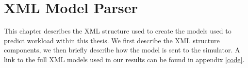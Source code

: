 \chapter{XML Model Parser} \label{ch:xmlparser}
 
This chapter describes the XML structure used to create the models used to predict workload within this thesis.  We first describe the XML structure components, we then briefly describe how the model is sent to the simulator.  A link to the full XML models used in our results can be found in appendix \ref{code}.

